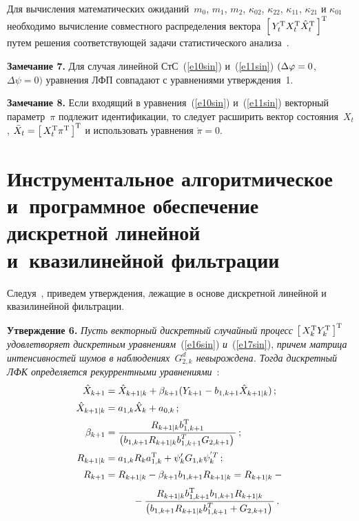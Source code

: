\begin{multicols}{2}
Для вычисления математических ожиданий~$m_0$, $m_1$, $m_2$, $\kappa_{02}$,
$\kappa_{22}$, $\kappa_{11}$, $\kappa_{21}$ и $\kappa_{01}$  
необходимо вычисление совместного распределения вектора~$\left[\, Y_t^{\mathrm{T}} X_t^{\mathrm{T}} \hat X_t^{\mathrm{T}}\,\right]^{\mathrm{T}}$ 
путем решения соответствующей задачи статистического анализа~\cite{4sin}.


\bigskip

\noindent
\textbf{Замечание 7.} 
Для случая линейной СтС~(\ref{e10sin}) и~(\ref{e11sin})  
$(\Delta \varphi =0$, $\Delta\psi=0)$ уравнения ЛФП совпадают с уравнениями утверждения~1.

\bigskip

\noindent
\textbf{Замечание 8.} 
Если входящий в уравнения~(\ref{e10sin}) и~(\ref{e11sin}) векторный параметр~$\pi$ 
подлежит идентификации, то следует расширить вектор состояния~$X_t$, 
$\bar X_t =\left[\, X_t^{\mathrm{T}} \pi^{\mathrm{T}}\,\right]^{\mathrm{T}}$ и использовать уравнения $\dot \pi =0$.


\section{Инструментальное алгоритмическое и~программное обеспечение дискретной линейной и~квазилинейной фильтрации}

Следуя~\cite{3sin, 4sin}, приведем утверждения, лежащие в основе дискретной линейной и квазилинейной фильтрации.

\medskip

\noindent
\textbf{Утверждение 6.} 
\textit{Пусть векторный дискретный случайный процесс $\left[\, X_k^{\mathrm{T}} Y_k^{\mathrm{T}}\,\right]^{\mathrm{T}}$ 
удовлетворяет дискретным 
уравнениям}~(\ref{e16sin}) \textit{и}~(\ref{e17sin}), \textit{причем матрица интенсивностей шумов в наблюдениях~$G_{2,k}^d$ 
невырождена. Тогда дискретный ЛФК определяется рекуррентными уравнениями}~\cite{4sin}:
\begin{align*}
\hat X_{k+1} &=\hat X_{k+1\vert k} +\beta_{k+1} (Y_{k+1} -b_{1,k+1} \hat X_{k+1\vert k})\,; %
\\[1pt]
\hat X_{k+1\vert k} &= a_{1,k} \hat X_k + a_{0,k}\,;%
\\[1pt]
\beta_{k+1} &= \fr{R_{ k+1\vert k} b_{1, k+1}^{\mathrm{T}}}{\left( b_{1, k+1} R_{k+1\vert k} b_{1,k+1}^T G_{2,k+1}\right)}\,;
\\[1pt]
R_{k+1\vert k }&= a_{1,k} R_k a_{1,k}^{\mathrm{T}} +\psi_k' G_{1,k}\psi_k^{'T}\,; %
\\[1pt]
 R_{k+1} &= R_{k+1\vert k} -\beta_{k+1} b_{1, k+1} R_{k+1\vert k} = R_{k+1\vert k}-{}\\[3pt]
&\hspace*{10mm}{} - \fr{R_{k+1\vert k} b_{1, k+1}^{\mathrm{T}} 
 b_{1,k+1} R_{k+1\vert k}}{\left( b_{1,k+1} R_{k+1\vert k} b_{1,k+1}^T + G_{2, k+1}\right)}\,.
\end{align*}


\end{multicols}
